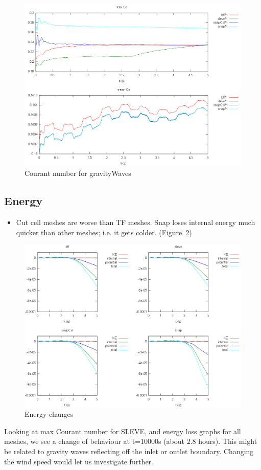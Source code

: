 \begin{figure}
	\includegraphics[width=\textwidth]{interim-results/gravityWavesCourants.png}
	\caption{Courant number for gravityWaves}
	\label{fig:gw:courant}
\end{figure}

\subsection{Energy}
\begin{itemize}
	\item Cut cell meshes are worse than TF meshes.  Snap loses internal energy much quicker than other meshes; i.e. it gets colder. (Figure~\ref{fig:gw:energy})
\end{itemize}

\begin{figure}
	\includegraphics[width=\textwidth]{interim-results/gravityWavesEnergy.png}
	\caption{Energy changes}
	\label{fig:gw:energy}
\end{figure}

Looking at max Courant number for SLEVE, and energy loss graphs for all meshes, we see a change of behaviour at t=10000s (about 2.8 hours).  This might be related to gravity waves reflecting off the inlet or outlet boundary.  Changing the wind speed would let us investigate further.
